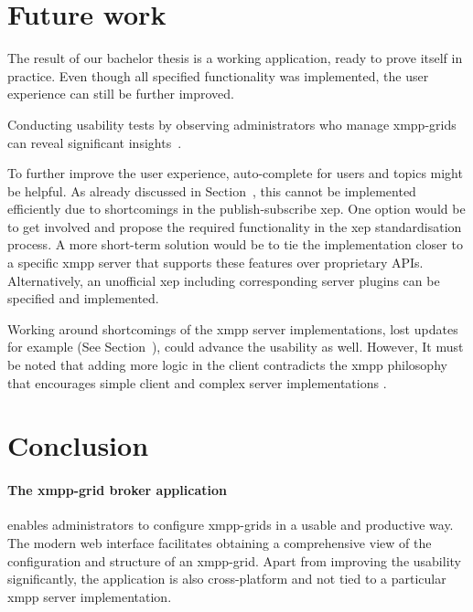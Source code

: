 

\section{Future work}
The result of our bachelor thesis is a working application, ready to prove itself in practice.
Even though all specified functionality was implemented, the user experience can still be further improved.

Conducting usability tests by observing administrators who manage \glspl{xmpp-grid} can reveal significant insights~\cite{krug:dont-make-me-think}.

To further improve the user experience, auto-complete for users and topics might be helpful.
As already discussed in Section~, this cannot be implemented efficiently due to shortcomings in the \gls{publish-subscribe} \gls{xep}.
One option would be to get involved and propose the required functionality in the \gls{xep} standardisation process.
A more short-term solution would be to tie the implementation closer to a specific \gls{xmpp} server that supports these features over proprietary APIs.
Alternatively, an unofficial \gls{xep} including corresponding server plugins can be specified and implemented.

Working around shortcomings of the \gls{xmpp} server implementations, lost updates for example (See Section~), could advance the usability as well.
However, It must be noted that adding more logic in the client contradicts the \gls{xmpp} philosophy that encourages simple client and complex server implementations \cite{definitive-guide-xmpp}.

\section{Conclusion}
\paragraph{The \gls{xmpp-grid} \gls{broker} application} enables administrators to configure \glspl{xmpp-grid} in a usable and productive way.
The modern web interface facilitates obtaining a comprehensive view of the configuration and structure of an \gls{xmpp-grid}.
Apart from improving the usability significantly, the application is also cross-platform and not tied to a particular \gls{xmpp} server implementation.

